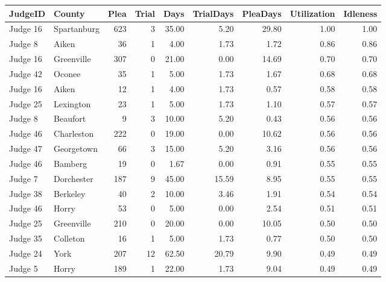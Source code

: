 \begin{tabular}{llrrrrrrr}
\toprule
 JudgeID &       County &  Plea &  Trial &  Days &  TrialDays &  PleaDays &  Utilization &  Idleness \\
\midrule
Judge 16 &  Spartanburg &   623 &      3 & 35.00 &       5.20 &     29.80 &         1.00 &      1.00 \\
 Judge 8 &        Aiken &    36 &      1 &  4.00 &       1.73 &      1.72 &         0.86 &      0.86 \\
Judge 16 &   Greenville &   307 &      0 & 21.00 &       0.00 &     14.69 &         0.70 &      0.70 \\
Judge 42 &       Oconee &    35 &      1 &  5.00 &       1.73 &      1.67 &         0.68 &      0.68 \\
Judge 16 &        Aiken &    12 &      1 &  4.00 &       1.73 &      0.57 &         0.58 &      0.58 \\
Judge 25 &    Lexington &    23 &      1 &  5.00 &       1.73 &      1.10 &         0.57 &      0.57 \\
 Judge 8 &     Beaufort &     9 &      3 & 10.00 &       5.20 &      0.43 &         0.56 &      0.56 \\
Judge 46 &   Charleston &   222 &      0 & 19.00 &       0.00 &     10.62 &         0.56 &      0.56 \\
Judge 47 &   Georgetown &    66 &      3 & 15.00 &       5.20 &      3.16 &         0.56 &      0.56 \\
Judge 46 &      Bamberg &    19 &      0 &  1.67 &       0.00 &      0.91 &         0.55 &      0.55 \\
 Judge 7 &   Dorchester &   187 &      9 & 45.00 &      15.59 &      8.95 &         0.55 &      0.55 \\
Judge 38 &     Berkeley &    40 &      2 & 10.00 &       3.46 &      1.91 &         0.54 &      0.54 \\
Judge 46 &        Horry &    53 &      0 &  5.00 &       0.00 &      2.54 &         0.51 &      0.51 \\
Judge 25 &   Greenville &   210 &      0 & 20.00 &       0.00 &     10.05 &         0.50 &      0.50 \\
Judge 35 &     Colleton &    16 &      1 &  5.00 &       1.73 &      0.77 &         0.50 &      0.50 \\
Judge 24 &         York &   207 &     12 & 62.50 &      20.79 &      9.90 &         0.49 &      0.49 \\
 Judge 5 &        Horry &   189 &      1 & 22.00 &       1.73 &      9.04 &         0.49 &      0.49 \\

\end{tabular}
